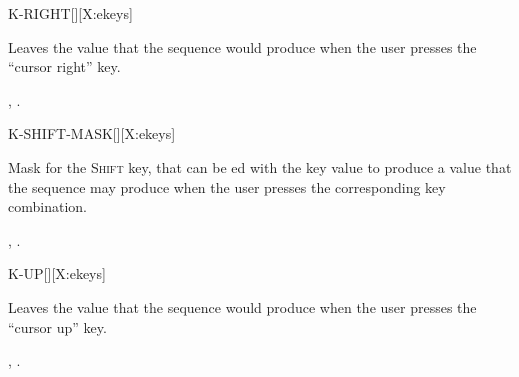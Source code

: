\begin{worddef*}{}{K-RIGHT}[][X:ekeys]
\item {}

	Leaves the value  that the sequence 
	 would produce when the user presses the
	``cursor right'' key.


\see {},
	.
\end{worddef*}


\begin{worddef*}{}{K-SHIFT-MASK}[][X:ekeys]
\item {}

	Mask for the \textsc{Shift} key, that can be ed with the
	key value to produce a value that the sequence 
	 may produce when the user presses the
	corresponding key combination.

\see {},
	.
\end{worddef*}


\begin{worddef*}{}{K-UP}[][X:ekeys]
\item {}

	Leaves the value  that the sequence 
	 would produce when the user presses the
	``cursor up'' key.


\see {},
	.
\end{worddef*}





